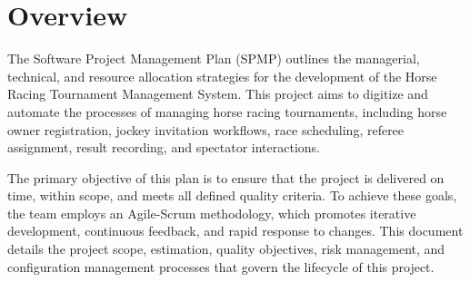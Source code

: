 \section{Overview}

The Software Project Management Plan (SPMP) outlines the managerial, technical, and resource allocation strategies for the development of the Horse Racing Tournament Management System. This project aims to digitize and automate the processes of managing horse racing tournaments, including horse owner registration, jockey invitation workflows, race scheduling, referee assignment, result recording, and spectator interactions.

The primary objective of this plan is to ensure that the project is delivered on time, within scope, and meets all defined quality criteria. To achieve these goals, the team employs an Agile-Scrum methodology, which promotes iterative development, continuous feedback, and rapid response to changes. This document details the project scope, estimation, quality objectives, risk management, and configuration management processes that govern the lifecycle of this project.

